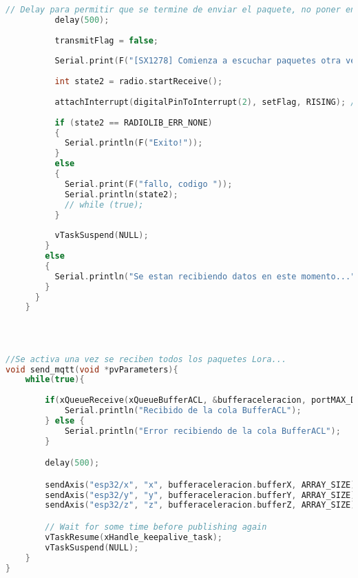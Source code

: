 \begin{lstlisting}[language=C++, caption=Tarea para envío de actualización de RTC desde estación base]
          // Delay para permitir que se termine de enviar el paquete, no poner en modo receptor de inmediato
          delay(500);
    
          transmitFlag = false;
    
          Serial.print(F("[SX1278] Comienza a escuchar paquetes otra vez... \n"));
    
          int state2 = radio.startReceive();
    
          attachInterrupt(digitalPinToInterrupt(2), setFlag, RISING); // Reinicia ISR
    
          if (state2 == RADIOLIB_ERR_NONE)
          {
            Serial.println(F("Exito!"));
          }
          else
          {
            Serial.print(F("fallo, codigo "));
            Serial.println(state2);
            // while (true);
          }
    
          vTaskSuspend(NULL);
        }
        else
        {
          Serial.println("Se estan recibiendo datos en este momento...");
        }
      }
    }
    
    \end{lstlisting}

\begin{lstlisting}[language=C++, caption=Tarea de envio de datos de aceleración vía MQTT]

    
//Se activa una vez se reciben todos los paquetes Lora...
void send_mqtt(void *pvParameters){
    while(true){
        
        if(xQueueReceive(xQueueBufferACL, &bufferaceleracion, portMAX_DELAY)){
            Serial.println("Recibido de la cola BufferACL");
        } else {
            Serial.println("Error recibiendo de la cola BufferACL");
        }

        delay(500);

        sendAxis("esp32/x", "x", bufferaceleracion.bufferX, ARRAY_SIZE);
        sendAxis("esp32/y", "y", bufferaceleracion.bufferY, ARRAY_SIZE);
        sendAxis("esp32/z", "z", bufferaceleracion.bufferZ, ARRAY_SIZE);

        // Wait for some time before publishing again
        vTaskResume(xHandle_keepalive_task);
        vTaskSuspend(NULL);
    }
}

\end{lstlisting}


